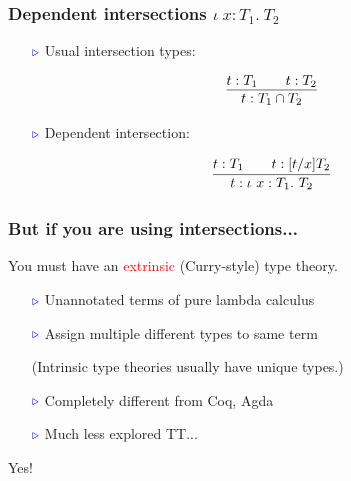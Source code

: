 \documentclass[11pt]{beamer}
\newcommand{\myb}[0]{\ensuremath{\textcolor{blue}{\triangleright}}}
\begin{document}
\begin{frame}
  \frametitle{Dependent intersections $\iota\ x:T_1.\ T_2$}

  \begin{itemize}
  \item[$\myb$] Usual intersection types:

    \[
    \infer{t : T_1 \cap T_2}{t : T_1 \qquad t : T_2}
    \]

    \item[$\myb$] Dependent intersection:

    \[
    \infer{t : \iota\ x : T_1 .\ T_2}{t : T_1 \qquad t : [t/x]T_2}
    \]

  \end{itemize}
  
\vspace{.3cm}

  \begin{center}
    \color{purple}
  \end{center}
  \end{frame}

\begin{frame}
  \frametitle{But if you are using intersections...}

  \pause

  You must have an \textcolor{red}{extrinsic} (Curry-style) type theory.

  \vspace{.25cm}

  \begin{itemize}
\pause
  \item[$\myb$] Unannotated terms of pure lambda calculus
\pause
  \item[$\myb$] Assign multiple different types to same term

 (Intrinsic type theories usually have unique types.)

\pause
  \item[$\myb$] Completely different from Coq, Agda
\pause
  \item[$\myb$] Much less explored TT...
  \end{itemize}
  

  \pause

\vspace{1cm}

  {\Large \color{red} Yes!}
\end{frame}
  
\end{document}
